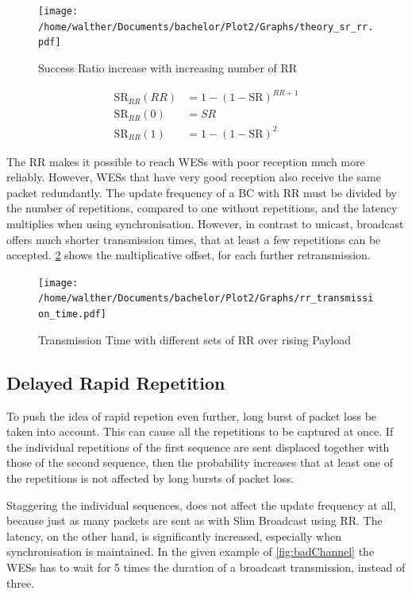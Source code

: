 \begin{figure}[h]
	\centering
	\texttt{[image: /home/walther/Documents/bachelor/Plot2/Graphs/theory\_sr\_rr.pdf]}
	\caption{Success Ratio increase with increasing number of RR}
	\label{fig:theory_rr_sc}
\end{figure}

\begin{align}
	\label{math:rr_sr}
	\text{SR}_{RR}(RR)	&= 1-(1-\text{SR})^{RR+1} \\
	\text{SR}_{RR}(0) 	&= SR \\
	\text{SR}_{RR}(1) 	&= 1-(1-\text{SR})^{2}
\end{align}

The RR makes it possible to reach WESs with poor reception much more reliably.
However, WESs that have very good reception also receive the same packet redundantly.
The update frequency of a BC with RR must be divided by the number of repetitions, 
compared to one without repetitions,
and the latency multiplies when using synchronisation.
However, in contrast to unicast, broadcast offers much shorter transmission times,
that at least a few repetitions can be accepted. 
\cref{fig:rr_analytic} shows the multiplicative offset, for each further retransmission.

\begin{figure}[h]
	\centering
	\texttt{[image: /home/walther/Documents/bachelor/Plot2/Graphs/rr\_transmission\_time.pdf]}
	\caption{Transmission Time with different sets of RR over rising Payload}
	\label{fig:rr_analytic}
\end{figure}

\subsection*{Delayed Rapid Repetition}
\label{sub:DelayedRepetition}

To push the idea of rapid repetion even further, long burst of packet loss be taken into account.
This can cause all the repetitions to be captured at once.
If the individual repetitions of the first sequence 
are sent displaced together with those of the second sequence,
then the probability increases that at least one of the repetitions 
is not affected by long bursts of packet loss.

Staggering the individual sequences, does not affect the update frequency at all,
because just as many packets are sent as with Slim Broadcast using RR.
The latency, on the other hand, is significantly increased, especially when synchronisation is maintained.
In the given example of \cref{fig:badChannel} 
the WESs has to wait for 5 times the duration of a broadcast transmission, instead of three.

